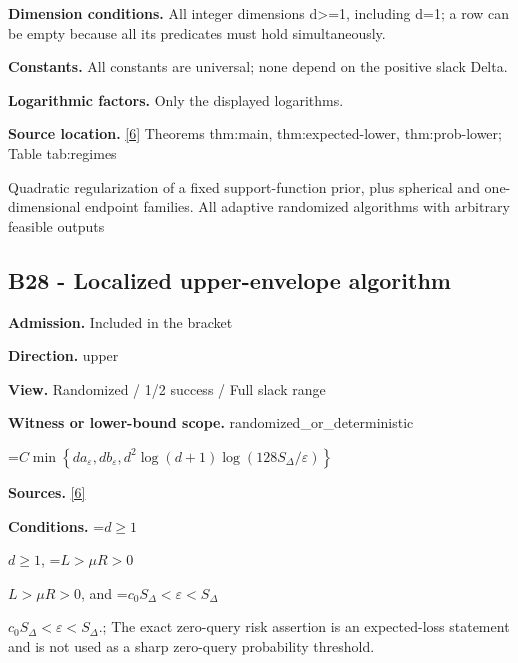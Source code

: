 \documentclass[10pt,a4paper]{article}
\newcommand{\AtlasMath}[1]{\par\begingroup\centering\setbox0=\hbox{$\displaystyle #1$}\ifdim\wd0>1.4\linewidth\typeout{ATLAS WIDE FORMULA: \the\wd0}\fi\ifdim\wd0>\linewidth\resizebox{\linewidth}{!}{\box0}\else\box0\fi\par\endgroup}
\newcommand{\AtlasInlineMath}[1]{\begingroup\setbox0=\hbox{$#1$}\ifdim\wd0>.4\linewidth\endgroup\AtlasMath{#1}\else\endgroup$#1$\fi}
\begin{document}
\textbf{Dimension conditions.} All integer dimensions d>=1, including d=1; a row can be empty because all its predicates must hold simultaneously.



\textbf{Constants.} All constants are universal; none depend on the positive slack Delta.



\textbf{Logarithmic factors.} Only the displayed logarithms.



\textbf{Source location.} \href{https://github.com/WU-Wendao/Colombo/blob/main/colombo_sensorium/Complexity_altas/data/sources/colombo/U10/manuscript.pdf}{[6]} Theorems thm:main, thm:expected-lower, thm:prob-lower; Table tab:regimes



Quadratic regularization of a fixed support-function prior, plus spherical and one-dimensional endpoint families. All adaptive randomized algorithms with arbitrary feasible outputs



\subsection{B28 - Localized upper-envelope algorithm}


\textbf{Admission.} Included in the bracket



\textbf{Direction.} upper



\textbf{View.} Randomized / 1/2 success / Full slack range



\textbf{Witness or lower-bound scope.} randomized\_or\_deterministic



\AtlasMath{C\min\left\{da_\varepsilon,db_\varepsilon,d^2\log(d+1)\log(128S_\Delta/\varepsilon)\right\}}


\textbf{Sources.} \href{https://github.com/WU-Wendao/Colombo/blob/main/colombo_sensorium/Complexity_altas/data/sources/colombo/U10/manuscript.pdf}{[6]}



\textbf{Conditions.} \AtlasInlineMath{d\ge1}, \AtlasInlineMath{L>\mu R>0}, and \AtlasInlineMath{c_0S_\Delta<\varepsilon<S_\Delta}.; The exact zero-query risk assertion is an expected-loss statement and is not used as a sharp zero-query probability threshold.
\end{document}
